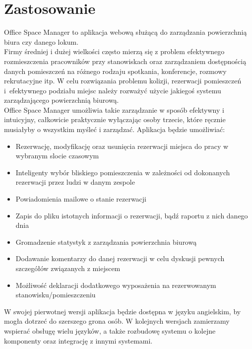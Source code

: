 \documentclass{article}
\begin{document}
\section{Zastosowanie}
\hspace{10mm} Office Space Manager to aplikacja webową służącą do zarządzania powierzchnią biura czy danego lokum.\\
\hspace*{10mm} Firmy średniej i dużej wielkości często mierzą się z problem efektywnego rozmieszczenia pracowników przy stanowiskach oraz zarządzaniem dostępnością danych pomieszczeń na różnego rodzaju spotkania, konferencje, rozmowy rekrutacyjne itp. W celu rozwiązania problemu kolizji, rezerwacji pomieszczeń i~efektywnego podziału miejsc należy rozważyć użycie jakiegoś systemu zarządzającego powierzchnią biurową.\\
\hspace*{10mm} Office Space Manager umożliwia takie zarządzanie w sposób efektywny i intuicyjny, całkowicie praktycznie wyłączając osoby trzecie, które ręcznie musiałyby o wszystkim myśleć i zarządzać. Aplikacja będzie umożliwiać:
\begin{itemize}
  \item Rezerwację, modyfikację oraz usunięcia rezerwacji miejsca do pracy w wybranym slocie czasowym
  \item Inteligenty wybór bliskiego pomieszczenia w zależności od dokonanych rezerwacji przez ludzi w danym zespole
  \item Powiadomienia mailowe o stanie rezerwacji
  \item Zapis do pliku istotnych informacji o rezerwacji, bądź raportu z nich danego dnia
  \item Gromadzenie statystyk z zarządzania powierzchnia biurową
  \item Dodawanie komentarzy do danej rezerwacji w celu dyskusji pewnych szczegółów związanych z miejscem
  \item Możliwość deklaracji dodatkowego wyposażenia na rezerwowanym stanowisku/pomieszczeniu
\end{itemize}
\hspace*{10mm} W swojej pierwotnej wersji aplikacja będzie dostępna w języku angielskim, by mogła
dotrzeć do szerszego grona osób. W kolejnych wersjach zamierzamy wspierać
obsługę wielu języków, a także rozbudowę systemu o kolejne komponenty oraz integrację z innymi systemami.
\end{document}
